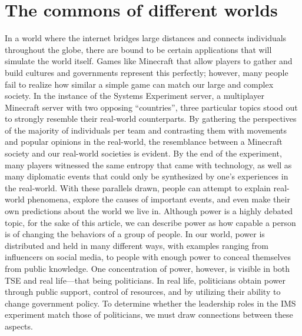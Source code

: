 \section{The commons of different worlds}
In a world where the internet bridges large distances and connects individuals throughout the globe, there are bound to be certain applications that will simulate the world itself. Games like Minecraft that allow players to gather and build cultures and governments represent this perfectly; however, many people fail to realize how similar a simple game can match our large and complex society. In the instance of the Systems Experiment server, a multiplayer Minecraft server with two opposing “countries”, three particular topics stood out to strongly resemble their real-world counterparts. By gathering the perspectives of the majority of individuals per team and contrasting them with movements and popular opinions in the real-world, the resemblance between a Minecraft society and our real-world societies is evident. By the end of the experiment, many players witnessed the same entropy that came with technology, as well as many diplomatic events that could only be synthesized by one’s experiences in the real-world. With these parallels drawn, people can attempt to explain real-world phenomena, explore the causes of important events, and even make their own predictions about the world we live in. Although power is a highly debated topic, for the sake of this article, we can describe power as how capable a person is of changing the behaviors of a group of people. In our world, power is distributed and held in many different ways, with examples ranging from influencers on social media, to people with enough power to conceal themselves from public knowledge. One concentration of power, however, is visible in both TSE and real life—that being politicians. In real life, politicians obtain power through public support, control of resources, and by utilizing their ability to change government policy. To determine whether the leadership roles in the IMS experiment match those of politicians, we must draw connections between these aspects.

